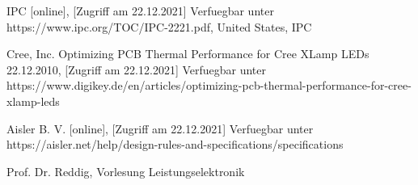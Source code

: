 \documentclass[10pt,a4paper,oneside,abstracton]{scrartcl}
\begin{document}
\begin{multicols}{2}
\begin{thebibliography}{9}
IPC  [online], [Zugriff am 22.12.2021] Verfuegbar unter https://www.ipc.org/TOC/IPC-2221.pdf, United States, IPC

Cree, Inc. Optimizing PCB Thermal Performance for Cree XLamp LEDs 22.12.2010, [Zugriff am 22.12.2021] Verfuegbar unter https://www.digikey.de/en/articles/optimizing-pcb-thermal-performance-for-cree-xlamp-leds

Aisler B. V.  [online], [Zugriff am 22.12.2021] Verfuegbar unter https://aisler.net/help/design-rules-and-specifications/specifications

Prof. Dr. Reddig, Vorlesung Leistungselektronik



\end{thebibliography}

\end{multicols}
 
\end{document}
